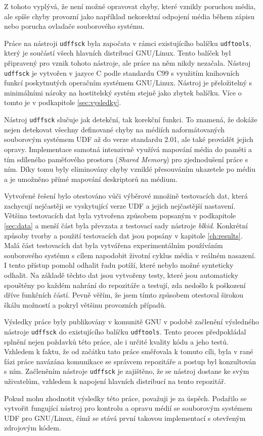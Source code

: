 Z tohoto vyplývá, že není možné opravovat chyby, které vznikly poruchou média, ale spíše chyby provozní jako například nekorektní odpojení média během zápisu nebo porucha ovladače souborového systému.

Práce na nástroji \texttt{udffsck} byla započata v rámci existujícího balíčku \texttt{udftools}, který je součástí všech hlavních distribucí GNU/Linux. Tento balíček byl připravený pro vznik tohoto nástroje, ale práce na něm nikdy nezačala. Nástroj \texttt{udffsck} je vytvořen v jazyce C podle standardu C99 s využitím knihovních funkcí poskytnutých operačním systémem \mbox{GNU/Linux}. Nástroj je přeložitelný s minimálními nároky na hostitelský systém stejně jako zbytek balíčku. Více o tomto je v podkapitole \ref{sec:vysledky}.

Nástroj \texttt{udffsck} slučuje jak detekční, tak korekční funkci. To znamená, že dokáže nejen detekovat všechny definované chyby na médiích naformátovaných souborovým systémem UDF až do verze standardu 2.01, ale také provádět jejich opravy. Implementace samotná intenzivně využívá mapování média do paměti a tím sdíleného paměťového prostoru (\textit{Shared Memory}) pro zjednodušení práce s ním. Díky tomu byly eliminovány chyby vzniklé přesouváním ukazetele po médiu a je umožněno přímé mapování deskriptorů na médium.

Vytvořené řešení bylo otestováno vůči výběrové množině testovacích dat, která zachycují nejčastěji se vyskytující verze UDF a jejich nejčastější nastavení. Většina testovacích dat byla vytvořena způsobem popsaným v podkapitole \ref{sec:data} a menší část byla převzata z testovací sady nástroje \textit{blkid}. Konkrétní způsoby tvorby a použití testovacích dat jsou popsány v kapitole \ref{ch:results}. Malá část testovacích dat byla vytvářena experimentálním používáním souborového systému s cílem napodobit životní cyklus média v reálném nasazení. I tento přístup pomohl odhalit řadu potíží, které nebylo možné synteticky odhalit. Na základě těchto dat jsou vytvořeny testy, které jsou automaticky spouštěny po každém nahrání do repozitáře a testují, zda nedošlo k poškození dříve funkčních částí. Pevně věřím, že jsem tímto způsobem otestoval širokou škálu možností a pokryl většinu provozních případů.

Výsledky práce byly publikovány v komunitě GNU v podobě začlenění výsledného nástroje \texttt{udffsck} do existujícího balíčku \texttt{udftools}. Tento proces předpokládal splnění nejen poždavků této práce, ale i určité kvality kódu a jeho testů. Vzhledem k faktu, že od začátku tato práce směřovala k tomuto cíli, byla v rané fázi práce navázána komunikace se správcem repozitáře a postup byl konzultován s ním. Začleněním nástroje \texttt{udffsck} je zajištěno, že se nástroj dostane ke svým uživatelům, vzhledem k napojení hlavních distribucí na tento repozitář.

Pokud mohu zhodnotit výsledky této práce, považuji je za úspěch. Podařilo se vytvořit fungující nástroj pro kontrolu a opravu médií se souborovým systémem UDF pro GNU/Linux, čímž se stává první takovou implementací s otevřeným zdrojovým kódem.
